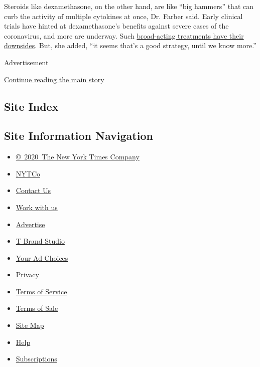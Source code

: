 Steroids like dexamethasone, on the other hand, are like ``big hammers''
that can curb the activity of multiple cytokines at once, Dr. Farber
said. Early clinical trials have hinted at dexamethasone's benefits
against severe cases of the coronavirus, and more are underway. Such
\href{https://www.ncbi.nlm.nih.gov/pmc/articles/PMC7196557/}{broad-acting
treatments have their downsides}. But, she added, ``it seems that's a
good strategy, until we know more.''

Advertisement

\protect\hyperlink{after-bottom}{Continue reading the main story}

\hypertarget{site-index}{%
\subsection{Site Index}\label{site-index}}

\hypertarget{site-information-navigation}{%
\subsection{Site Information
Navigation}\label{site-information-navigation}}

\begin{itemize}
\tightlist
\item
  \href{https://help.nytimes.com/hc/en-us/articles/115014792127-Copyright-notice}{©~2020~The
  New York Times Company}
\end{itemize}

\begin{itemize}
\tightlist
\item
  \href{https://www.nytco.com/}{NYTCo}
\item
  \href{https://help.nytimes.com/hc/en-us/articles/115015385887-Contact-Us}{Contact
  Us}
\item
  \href{https://www.nytco.com/careers/}{Work with us}
\item
  \href{https://nytmediakit.com/}{Advertise}
\item
  \href{http://www.tbrandstudio.com/}{T Brand Studio}
\item
  \href{https://www.nytimes.com/privacy/cookie-policy\#how-do-i-manage-trackers}{Your
  Ad Choices}
\item
  \href{https://www.nytimes.com/privacy}{Privacy}
\item
  \href{https://help.nytimes.com/hc/en-us/articles/115014893428-Terms-of-service}{Terms
  of Service}
\item
  \href{https://help.nytimes.com/hc/en-us/articles/115014893968-Terms-of-sale}{Terms
  of Sale}
\item
  \href{https://spiderbites.nytimes.com}{Site Map}
\item
  \href{https://help.nytimes.com/hc/en-us}{Help}
\item
  \href{https://www.nytimes.com/subscription?campaignId=37WXW}{Subscriptions}
\end{itemize}
